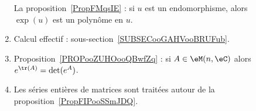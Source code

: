 \begin{description}
\begin{enumerate}
		            La proposition~\ref{PropFMqsIE} : si \( u\) est un endomorphisme, alors \( \exp(u)\) est un polynôme en \( u\).
		      \item
		            Calcul effectif : sous-section~\ref{SUBSECooGAHVooBRUFub}.
		      \item Proposition~\ref{PROPooZUHOooQBwfZq} : si \( A\in\eM(n,\eC)\) alors \( e^{\tr(A)}=\det( e^{A})\).
		      \item
		            Les séries entières de matrices sont traitées autour de la proposition~\ref{PropFIPooSSmJDQ}.
	      \end{enumerate}


\end{description}

